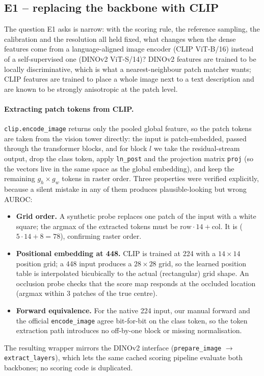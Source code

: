 \subsection{E1 -- replacing the backbone with CLIP}
\label{sec:method-e1}

The question E1 asks is narrow: with the scoring rule, the reference sampling, the
calibration and the resolution all held fixed, what changes when the dense features come from
a language-aligned image encoder (CLIP ViT-B/16) instead of a self-supervised one (DINOv2
ViT-S/14)? DINOv2 features are trained to be locally discriminative, which is what a
nearest-neighbour patch matcher wants; CLIP features are trained to place a whole image next
to a text description and are known to be strongly anisotropic at the patch level.

\paragraph{Extracting patch tokens from CLIP.}
\texttt{clip.encode\_image} returns only the pooled global feature, so the patch tokens are
taken from the vision tower directly: the input is patch-embedded, passed through the
transformer blocks, and for block $l$ we take the residual-stream output, drop the class
token, apply \texttt{ln\_post} and the projection matrix \texttt{proj} (so the vectors live
in the same space as the global embedding), and keep the remaining $g_h \times g_w$ tokens in
raster order. Three properties were verified explicitly, because a silent mistake in any of
them produces plausible-looking but wrong AUROC:
\begin{itemize}
  \item \textbf{Grid order.} A synthetic probe replaces one patch of the input with a white
        square; the argmax of the extracted tokens must be $\mathrm{row}\cdot14+\mathrm{col}$.
        It is ($5{\cdot}14{+}8 = 78$), confirming raster order.
  \item \textbf{Positional embedding at 448.} CLIP is trained at 224 with a $14{\times}14$
        position grid; a 448 input produces a $28{\times}28$ grid, so the learned position
        table is interpolated bicubically to the actual (rectangular) grid shape. An occlusion
        probe checks that the score map responds at the occluded location (argmax within 3
        patches of the true centre).
  \item \textbf{Forward equivalence.} For the native 224 input, our manual forward and the
        official \texttt{encode\_image} agree bit-for-bit on the class token, so the token
        extraction path introduces no off-by-one block or missing normalisation.
\end{itemize}
The resulting wrapper mirrors the DINOv2 interface
(\texttt{prepare\_image} $\rightarrow$ \texttt{extract\_layers}), which lets the same cached
scoring pipeline evaluate both backbones; no scoring code is duplicated.

